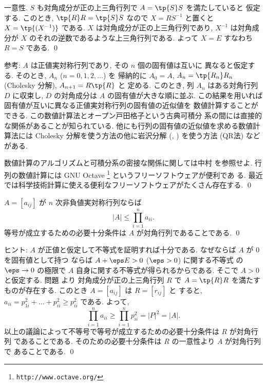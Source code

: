 \documentclass[12pt,twoside]{jarticle}
\begin{document}
一意性. $S$ も対角成分が正の上三角行列で $A=\tp{S}S$ を満たしていると
仮定する.  このとき, $\tp{R}R = \tp{S}S$ 
なので $X=RS^{-1}$ と置くと $X=\tp{(X^{-1})}$ である.
$X$ は対角成分が正の上三角行列であり, 
$X^{-1}$ は対角成分が $X$ のそれの逆数であるような上三角行列である.
よって $X=E$ すなわち $R=S$ である.
\qed

\medskip
\noindent
参考: $A$ は正値実対称行列であり, その $n$ 個の固有値は互いに
異なると仮定する.  そのとき, $A_n$ ($n=0,1,2,\dots$) を
帰納的に $A_0=A$, $A_n = \tp{R_n}R_n$ (Cholesky 分解), $A_{n+1}=R\tp{R}$ と
定める.  このとき, 列 $A_n$ はある対角行列 $D$ に収束し, 
$D$ の対角成分は $A$ の固有値が大きな順に並ぶ.  
この結果を用いれば固有値が互いに異なる正値実対称行列の固有値の近似値を
数値計算することができる.  この数値計算法とオープン戸田格子という古典可積分
系の間には直接的な関係があることが知られている.  
他にも行列の固有値の近似値を求める数値計算法には
Cholesky 分解を使う方法の他に岩沢分解 
(, )
を使う方法 (QR法) などがある.  

数値計算のアルゴリズムと可積分系の密接な関係に関しては中村 \cite{nakamura}
を参照せよ.  行列の数値計算には GNU Octave%
\footnote{{\tt http://www.octave.org/}} というフリーソフトウェアが便利であ
る. 最近では科学技術計算に使える便利なフリーソフトウェアがたくさん存在する.
\qed


\begin{question}
\label{q:pre-Hadamard-real}
  $A=[a_{ij}]$ が $n$ 次非負値実対称行列ならば
  \begin{equation*}
    |A| \le \prod_{i=1}^n a_{ii}.
  \end{equation*}
  等号が成立するための必要十分条件は $A$ が対角行列であることである.
  \qed
\end{question}

\noindent
ヒント: $A$ が正値と仮定して不等式を証明すれば十分である. 
なぜならば $A$ が $0$ を固有値として持つ
ならば $A+\eps E > 0$ ($\eps>0$) に関する不等式
の $\eps\to 0$ の極限で $A$ 自身に関する不等式が得られるからである.
そこで $A>0$ と仮定する. 
問題  より
対角成分が正の上三角行列 $R$ で $A=\tp{R}R$ を満たすものが存在する. 
このとき $A=[a_{ij}]$ は $R=[r_{ij}]$ と
すると, $a_{ii}=p_{1i}^2 + \dots + p_{ii}^2 \ge p_{ii}^2$ である. よって, 
\begin{equation*}
  \prod_{i=1}^n a_{ii} \ge \prod_{i=1}^n p_{ii}^2 = |P|^2 = |A|.
\end{equation*}
以上の議論によって不等号で等号が成立するための必要十分条件は $R$ が対角行列
であることである. そのための必要十分条件は $R$ の一意性より $A$ が対角行列で
あることである.
\qed
\end{document}
